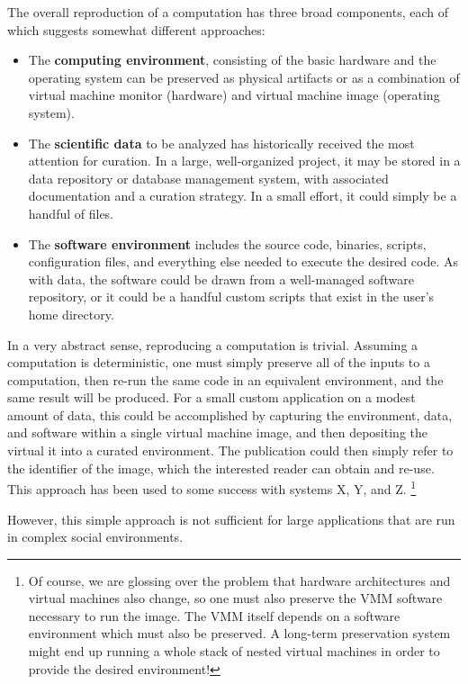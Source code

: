 \documentclass{acm_proc_article-sp}
\begin{document}
The overall reproduction of a computation has three broad components,
each of which suggests somewhat different approaches:

\begin{itemize}
\item The {\bf computing environment}, consisting of the basic hardware and the operating system can be preserved as physical artifacts or as a combination of virtual machine monitor (hardware) and virtual machine image (operating system).
\item The {\bf scientific data} to be analyzed has historically received the most attention for curation.  In a large, well-organized project, it may be stored in a  data repository or database management system, with associated documentation and a curation strategy.  In a small effort, it could simply be a handful of files.
\item The {\bf software environment} includes the source code, binaries, scripts, configuration files, and everything else needed to execute the desired code.  As with data, the software could be drawn from a well-managed software repository, or it could be a handful custom scripts that exist in the user's home directory.
\end{itemize}

In a very abstract sense, reproducing a computation is trivial.
Assuming a computation is deterministic, one must simply
preserve all of the inputs to a computation, then re-run
the same code in an equivalent environment, and the same result
will be produced.  For a small custom application on a modest
amount of data, this could be accomplished by capturing the environment,
data, and software within a single virtual machine image,
and then depositing the virtual
it into a curated environment.  The publication could
then simply refer to the identifier of the image, which the
interested reader can obtain and re-use.  This approach has
been used to some success with systems X, Y, and Z.
\footnote{Of course, we are glossing over the problem that hardware
architectures and virtual machines also change, so one must also
preserve the VMM software necessary to run the image.  The VMM itself
depends on a software environment which must also be preserved.
A long-term preservation system might end up running a whole
stack of nested virtual machines in order to provide the desired
environment! }

However, this simple approach is not sufficient for large applications
that are run in complex social environments.
\end{document}
